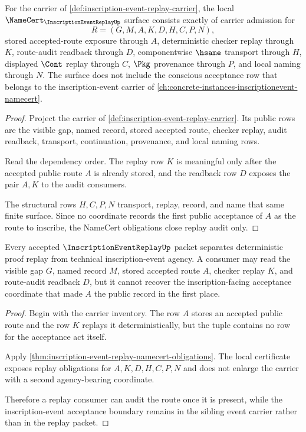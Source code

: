 \begin{theorem}
\label{thm:inscription-event-replay-namecert-obligations}
For the carrier of \autoref{def:inscription-event-replay-carrier}, the local $\NameCert_{\InscriptionEventReplayUp}$ surface consists exactly of carrier admission for
$$
R=(G,M,A,K,D,H,C,P,N),
$$
stored accepted-route exposure through $A$, deterministic checker replay through $K$, route-audit readback through $D$, componentwise $\hsame$ transport through $H$, displayed $\Cont$ replay through $C$, $\Pkg$ provenance through $P$, and local naming through $N$. The surface does not include the conscious acceptance row that belongs to the inscription-event carrier of \autoref{ch:concrete-instances-inscriptionevent-namecert}.
\end{theorem}
\begin{proof}
Project the carrier of \autoref{def:inscription-event-replay-carrier}. Its public rows are the visible gap, named record, stored accepted route, checker replay, audit readback, transport, continuation, provenance, and local naming rows.

Read the dependency order. The replay row $K$ is meaningful only after the accepted public route $A$ is already stored, and the readback row $D$ exposes the pair $A,K$ to the audit consumers.

The structural rows $H,C,P,N$ transport, replay, record, and name that same finite surface. Since no coordinate records the first public acceptance of $A$ as the route to inscribe, the NameCert obligations close replay audit only.
\end{proof}

\begin{theorem}
\label{thm:inscription-event-replay-noninscription-boundary}
Every accepted $\InscriptionEventReplayUp$ packet separates deterministic proof replay from technical inscription-event agency. A consumer may read the visible gap $G$, named record $M$, stored accepted route $A$, checker replay $K$, and route-audit readback $D$, but it cannot recover the inscription-facing acceptance coordinate that made $A$ the public record in the first place.
\end{theorem}
\begin{proof}
Begin with the carrier inventory. The row $A$ stores an accepted public route and the row $K$ replays it deterministically, but the tuple contains no row for the acceptance act itself.

Apply \autoref{thm:inscription-event-replay-namecert-obligations}. The local certificate exposes replay obligations for $A,K,D,H,C,P,N$ and does not enlarge the carrier with a second agency-bearing coordinate.

Therefore a replay consumer can audit the route once it is present, while the inscription-event acceptance boundary remains in the sibling event carrier rather than in the replay packet.
\end{proof}

